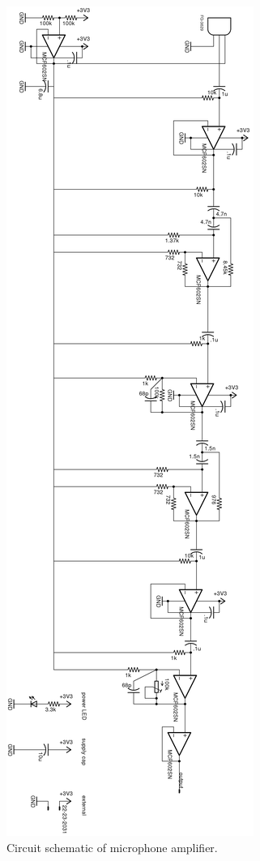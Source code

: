 \documentclass[letterpaper]{article}
\begin{document}
\begin{figure}
\centering
\includegraphics[height=\textheight]{figures/mic_amp_schematic.png}
\caption{Circuit schematic of microphone amplifier.}
\label{micamp_schem:fig}
\end{figure}
\end{document}

